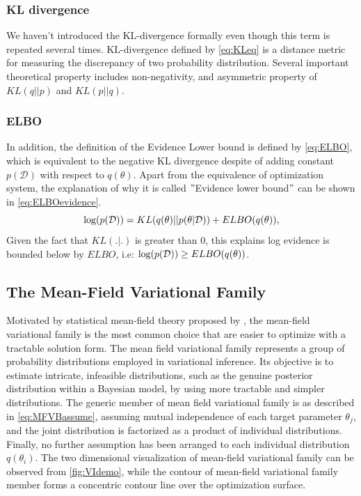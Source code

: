 \subsubsection{KL divergence}
We haven't introduced the KL-divergence formally even though this term is repeated several times. KL-divergence defined by \autoref{eq:KLeq} is a distance metric for measuring the discrepancy of two probability distribution. Several important theoretical property includes non-negativity, and asymmetric property of $KL(q||p)$ and $KL(p||q)$.

\subsubsection{ELBO}
In addition, the definition of the Evidence Lower bound is defined by \autoref{eq:ELBO}, which is equivalent to the negative KL divergence despite of adding constant $p(\mathcal{D})$ with respect to $q(\theta)$. 
Apart from the equivalence of optimization system, the explanation of why it is called $"$Evidence lower bound$"$ can be shown in \autoref{eq:ELBOevidence}.
\begin{equation}
	\label{eq:ELBOevidence}
	\textnormal{log}(p(\mathcal{D})) = KL(q(\theta)||p(\theta|\mathcal{D})) + ELBO(q(\theta)),
\end{equation}
Given the fact that $KL(.|.)$ is greater than 0, this explains log evidence is bounded below by $ELBO$, i.e: $\textnormal{log}(p(\mathcal{D})) \geq ELBO(q(\theta))$.

\subsection{The Mean-Field Variational Family} 
Motivated by statistical mean-field theory proposed by \cite{parisi1988statistical}, the mean-field variational family is the most common choice that are easier to optimize with a tractable solution form.
The mean field variational family represents a group of probability distributions employed in variational inference. Its objective is to estimate intricate, infeasible distributions, such as the genuine posterior distribution within a Bayesian model, by using more tractable and simpler distributions.
The generic member of mean field variational family is as described in \autoref{eq:MFVBassume}, assuming mutual independence of each target parameter $\theta_j$, and the joint distribution is factorized as a product of individual distributions. Finally, no further assumption has been arranged to each individual distribution $q(\theta_i)$.
The two dimensional visualization of mean-field variational family can be observed from \autoref{fig:VIdemo}, while the contour of mean-field variational family member forms a concentric contour line over the optimization surface.




